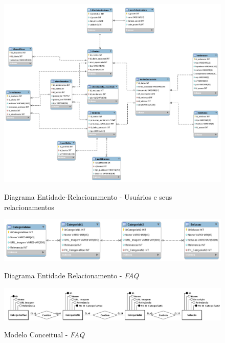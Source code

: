\begin{landscape}
\begin{figure}[h]
    \caption{Diagrama Entidade-Relacionamento - Usuários e seus relacionamentos}
    
    \centering %
    \includegraphics[width=19cm]{LaTeX/metaversoIFSP/anexos/DER-Usuarios-e-Derivados.png} %
    \label{der-usuario}
\end{figure}
\end{landscape}

\begin{landscape}
    \begin{figure}[h]
        \caption{Diagrama Entidade Relacionamento - \textit{FAQ}}
        
        \centering %
        \includegraphics[width=23cm]{LaTeX/metaversoIFSP/anexos/DER-FAQ.png} %
        \label{der-faq}
    \end{figure}
    
    \begin{figure}[h]
        \caption{Modelo Conceitual - \textit{FAQ}}
        
        \centering %
        \includegraphics[width=23cm]{LaTeX/metaversoIFSP/anexos/FAQ-Conceitual.png} %
        \label{mer-faq}
    \end{figure}
\end{landscape}

